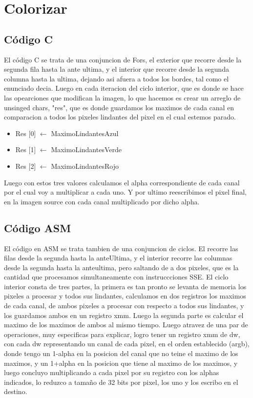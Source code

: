 \section{Colorizar}

\subsection{Código C}
	El código C se trata de una conjuncion de Fors, el exterior que recorre desde la segunda fila hasta la ante ultima,  y el interior que recorre desde la segunda columna hasta la ultima, dejando asi afuera a todos los bordes, tal como el enunciado decia. Luego en cada iteracion del ciclo interior, que es donde se hace las opearciones que modifican la imagen, lo que hacemos es crear un arreglo de unsinged chars, "res", que es  donde guardamos los maximos de cada canal en comparacion a todos  los pixeles lindantes del pixel en el cual estemos parado.
\begin{itemize}
\item {Res $[$0$]$ $\leftarrow$ MaximoLindantesAzul}
\item {Res $[$1$]$ $\leftarrow$ MaximoLindantesVerde}
\item {Res $[$2$]$ $\leftarrow$ MaximoLindantesRojo}
\end{itemize}
Luego con estos tres valores calculamos el alpha correspondiente de cada canal por el cual voy a multiplicar a cada uno. Y por ultimo reescribimos el pixel final, en la imagen source con cada canal multiplicado  por dicho alpha.

\subsection{Código ASM}
	El código en ASM se trata tambien de una conjuncion de ciclos. El recorre las filas desde la segunda hasta la anteUltima, y el interior recorre las columnas desde la segunda hasta la anteultima, pero saltando de a dos pixeles, que es la cantidad que procesamos simultaneamente con instruccciones SSE. 
    El ciclo interior consta de tres partes, la primera es tan pronto se levanta de memoria los pixeles a procesar y todos sus lindantes, calculamos en dos registros los maximos de cada canal, de ambos pixeles a procesar con respecto a todos sus lindantes, y los guardamos ambos en un registro xmm. Luego la segunda parte es calcular el maximo de los maximos de ambos al mismo tiempo. Luego atravez de una par de operaciones, muy especificas para explicar, logro tener un registro xmm de dw, con cada dw representando un canal de cada pixel, en el orden establecido (argb), donde tengo un 1-alpha en la posicion del canal que no teine el maximo de los maximos, y un 1+alpha en la posicion que tiene al maximo de los maximos, y luego concluyo multiplicando a cada pixel por su registro con los alphas indicados, lo reduzco a tamaño de 32 bits por pixel, los uno y los escribo en el destino.
	

